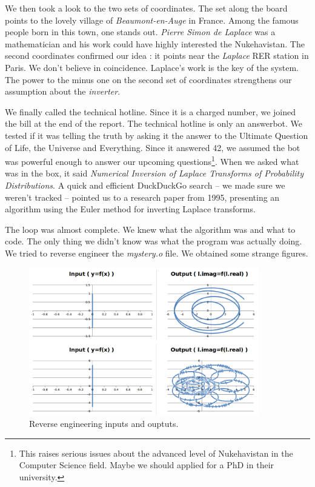 \documentclass[11pt,a4paper]{article}
\begin{document}
We then took a look to the two sets of coordinates. The set along the board points to the lovely village of \textit{Beaumont-en-Auge} in France. Among the famous people born in this town, one stands out. \textit{Pierre Simon de Laplace} was a mathematician and his work could have highly interested the Nukehavistan. The second coordinates confirmed our idea : it points near the \textit{Laplace} RER station in Paris. We don't believe in coincidence. Laplace's work is the key of the system. The power to the minus one on the second set of coordinates strengthens our assumption about the \textit{inverter}.

We finally called the technical hotline. Since it is a charged number, we joined the bill at the end of the report. The technical hotline is only an answerbot. We tested if it was telling the truth by asking it the answer to the Ultimate Question of Life, the Universe and Everything. Since it answered 42, we assumed the bot was powerful enough to answer our upcoming questions\footnote{This raises serious issues about the advanced level of Nukehavistan in the Computer Science field. Maybe we should applied for a PhD in their university.}. When we asked what was in the box, it said \textit{Numerical Inversion of Laplace Transforms of Probability Distributions}. A quick and efficient DuckDuckGo search -- we made sure we weren't tracked -- pointed us to a research paper from 1995, presenting an algorithm using the Euler method for inverting Laplace transforms.

The loop was almost complete. We knew what the algorithm was and what to code. The only thing we didn't know was what the program was actually doing. We tried to reverse engineer the \textit{mystery.o} file. We obtained some strange figures.

\begin{figure}[!h]
\centering
\includegraphics[width=10cm]{outputs.png}
\caption{Reverse engineering inputs and ouptuts.}
\label{reverse}
\end{figure}
\end{document}
